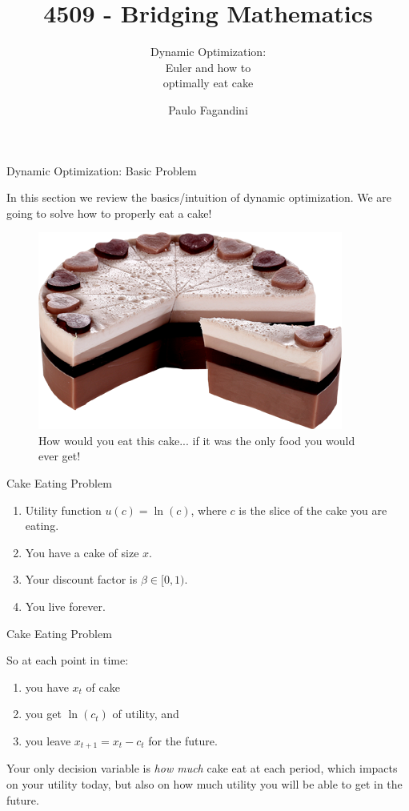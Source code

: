 \documentclass[aspectratio=169]{beamer}
\title[]{4509 - Bridging Mathematics}
\subtitle{Dynamic Optimization:\\Euler and how to\\ optimally eat cake}
\author[P. Fagandini]{Paulo Fagandini}
\institute{}
\date{}
\begin{document}
\begin{frame}{Dynamic Optimization: Basic Problem}
    
    In this section we review the basics/intuition of dynamic optimization. We are going to solve how to properly eat a cake!
    
    \begin{figure}
        \centering
        \includegraphics[scale = 0.8]{cake.png}
        \caption{How would you eat this cake... if it was the only food you would ever get!}
        \label{fig:cake}
    \end{figure}
\end{frame}

\begin{frame}{Cake Eating Problem}
    
    \begin{enumerate}
        \item Utility function $u(c) = \ln(c)$, where $c$ is the slice of the cake you are eating.
        \item You have a cake of size $x$.
        \item Your discount factor is $\beta\in[0,1)$.
        \item You live forever.
    \end{enumerate}
    
\end{frame}

\begin{frame}{Cake Eating Problem}
    
    So at each point in time:
    \begin{enumerate}
        \item you have $x_t$ of cake
        \item you get $\ln(c_t)$ of utility, and
        \item you leave $x_{t+1} = x_t - c_t$ for the future.
    \end{enumerate}
    
    Your only decision variable is \emph{how much} cake eat at each period, which impacts on your utility today, but also on how much utility you will be able to get in the future.
    
\end{frame}
\end{document}

